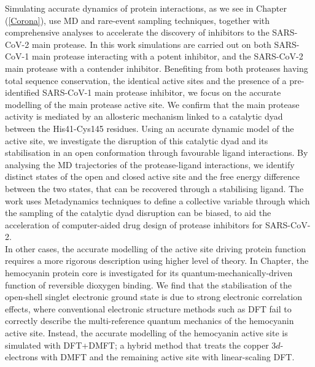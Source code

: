 Simulating accurate dynamics of protein interactions, as we see in Chapter (\ref{Corona}), use MD and rare-event sampling techniques, together with comprehensive analyses to accelerate the discovery of inhibitors to the SARS-CoV-2 main protease. In this work simulations are carried out on both SARS-CoV-1 main protease interacting with a potent inhibitor, and the SARS-CoV-2 main protease with a contender inhibitor. Benefiting from both proteases having total sequence conservation, the identical active sites and the presence of a pre-identified SARS-CoV-1 main protease inhibitor, we focus on the accurate modelling of the main protease active site. We confirm that the main protease activity is mediated by an allosteric mechanism linked to a catalytic dyad between the His41-Cys145 residues. Using an accurate dynamic model of the active site, we investigate the disruption of this catalytic dyad and its stabilisation in an open conformation through favourable ligand interactions. By analysing the MD trajectories of the protease-ligand interactions, we identify distinct states of the open and closed active site and the free energy difference between the two states, that can be recovered through a stabilising ligand. The work uses Metadynamics techniques to define a collective variable through which the sampling of the catalytic dyad disruption can be biased, to aid the acceleration of computer-aided drug design of protease inhibitors for SARS-CoV-2.\\ 

In other cases, the accurate modelling of the active site driving protein function requires a more rigorous description using higher level of theory. In Chapter, the hemocyanin protein core is investigated for its quantum-mechanically-driven function of reversible dioxygen binding. We find that the stabilisation of the open-shell singlet electronic ground state is due to strong electronic correlation effects, where conventional electronic structure methods such as DFT fail to correctly describe the multi-reference quantum mechanics of the hemocyanin active site. Instead, the accurate modelling of the hemocyanin active site is simulated with DFT+DMFT; a hybrid method that treats the copper 3$d$-electrons with DMFT and the remaining active site with linear-scaling DFT. 
